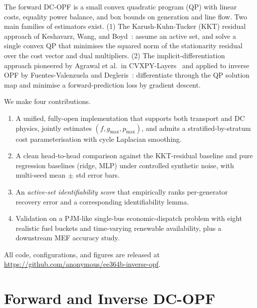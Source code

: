 \documentclass[conference]{IEEEtran}
\begin{document}
The forward DC-OPF is a small convex quadratic program (QP) with linear costs,
equality power balance, and box bounds on generation and line flow. Two main
families of estimators exist. (1) The Karush-Kuhn-Tucker (KKT) residual
approach of Keshavarz, Wang, and Boyd~\cite{keshavarz2011imputing}: assume an
active set, and solve a single convex QP that minimises the squared norm of
the stationarity residual over the cost vector and dual multipliers.
(2) The implicit-differentiation approach pioneered by Agrawal et al.\ in
CVXPY-Layers~\cite{agrawal2019differentiable} and applied to inverse OPF by
Fuentes-Valenzuela and Degleris~\cite{fuentes2024}: differentiate through
the QP solution map and minimise a forward-prediction loss by gradient
descent.

We make four contributions.
\begin{enumerate}
  \item A unified, fully-open implementation that supports both transport
        and DC physics, jointly estimates $(f, g_{\max}, p_{\max})$, and
        admits a stratified-by-stratum cost parameterisation with cycle
        Laplacian smoothing.
  \item A clean head-to-head comparison against the KKT-residual baseline
        and pure regression baselines (ridge, MLP) under controlled
        synthetic noise, with multi-seed mean$\,\pm\,$std error bars.
  \item An \emph{active-set identifiability score} that empirically
        ranks per-generator recovery error and a corresponding
        identifiability lemma.
  \item Validation on a PJM-like single-bus economic-dispatch problem with
        eight realistic fuel buckets and time-varying renewable
        availability, plus a downstream MEF accuracy study.
\end{enumerate}

All code, configurations, and figures are released at
\url{https://github.com/anonymous/ee364b-inverse-opf}.

\section{Forward and Inverse DC-OPF}
\label{sec:forward}
\end{document}
